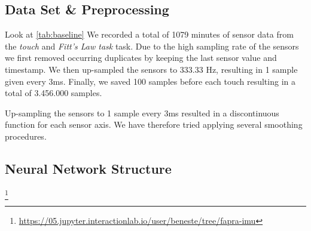 \subsection{Data Set \& Preprocessing}
\label{sec:prepro}
Look at \cref{tab:baseline}
We recorded a total of 1079 minutes of sensor data from the \textit{touch} and \textit{Fitt's Law task} task. 
Due to the high sampling rate of the sensors we first removed occurring duplicates by keeping the last sensor value and timestamp.
We then up-sampled the sensors to 333.33 Hz, resulting in 1 sample given every 3ms. 
Finally, we saved 100 samples before each touch resulting in a total of 3.456.000 samples.

Up-sampling the sensors to 1 sample every 3ms resulted in a discontinuous function for each sensor axis. 
We have therefore tried applying several smoothing procedures.

\subsection{Neural Network Structure}


\footnote{\url{https://05.jupyter.interactionlab.io/user/beneste/tree/fapra-imu}}


%

